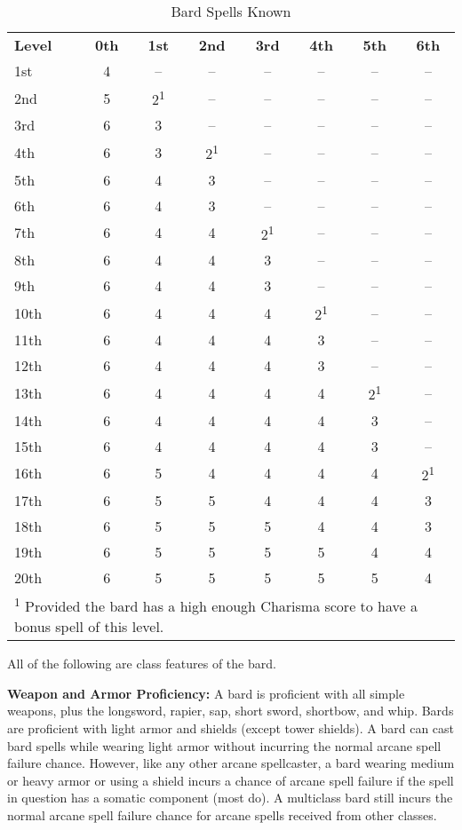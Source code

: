 \begin{table}[htb]
\caption{Bard Spells Known}
\centering
\begin{tabular}{l*{7}{c}}
\textbf{Level} & \textbf{0th} & \textbf{1st} & \textbf{2nd} & \textbf{3rd} & \textbf{4th} & \textbf{5th} & \textbf{6th} \\
1st & 4 & -- & -- & -- & -- & -- & --\\
2nd & 5 & 2\textsuperscript{1} & -- & -- & -- & -- & --\\
3rd & 6 & 3 & -- & -- & -- & -- & --\\
4th & 6 & 3 & 2\textsuperscript{1} & -- & -- & -- & --\\
5th & 6 & 4 & 3 & -- & -- & -- & --\\
6th & 6 & 4 & 3 & -- & -- & -- & --\\
7th & 6 & 4 & 4 & 2\textsuperscript{1} & -- & -- & --\\
8th & 6 & 4 & 4 & 3 & -- & -- & --\\
9th & 6 & 4 & 4 & 3 & -- & -- & --\\
10th & 6 & 4 & 4 & 4 & 2\textsuperscript{1} & -- & --\\
11th & 6 & 4 & 4 & 4 & 3 & -- & --\\
12th & 6 & 4 & 4 & 4 & 3 & -- & --\\
13th & 6 & 4 & 4 & 4 & 4 & 2\textsuperscript{1} & --\\
14th & 6 & 4 & 4 & 4 & 4 & 3 & --\\
15th & 6 & 4 & 4 & 4 & 4 & 3 & --\\
16th & 6 & 5 & 4 & 4 & 4 & 4 & 2\textsuperscript{1}\\
17th & 6 & 5 & 5 & 4 & 4 & 4 & 3\\
18th & 6 & 5 & 5 & 5 & 4 & 4 & 3\\
19th & 6 & 5 & 5 & 5 & 5 & 4 & 4\\
20th & 6 & 5 & 5 & 5 & 5 & 5 & 4\\
\multicolumn{8}{p{7cm}}{\textsuperscript{1} Provided the bard has a high enough Charisma score to have a bonus spell of this level.}\\
\end{tabular}
\end{table}

\ClassFeatures

All of the following are class features of the bard.

\textbf{Weapon and Armor Proficiency:} A bard is proficient with all simple weapons, 
plus the longsword, rapier, sap, short sword, shortbow, and whip. Bards are proficient 
with light armor and shields (except tower shields). A bard can cast bard spells 
while wearing light armor without incurring the normal arcane spell failure chance. 
However, like any other arcane spellcaster, a bard wearing medium or heavy armor 
or using a shield incurs a chance of arcane spell failure if the spell in question 
has a somatic component (most do). A multiclass bard still incurs the normal arcane 
spell failure chance for arcane spells received from other classes.

